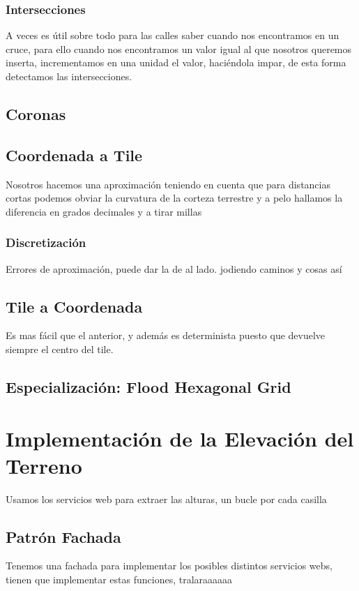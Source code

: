 \subsubsection*{Intersecciones}
A veces es útil sobre todo para las calles saber cuando nos encontramos en un
cruce, para ello cuando nos encontramos un valor igual al que nosotros queremos
inserta, incrementamos en una unidad el valor, haciéndola impar, de esta forma
detectamos las intersecciones.
\subsection*{Coronas}
\subsection*{Coordenada a Tile}
Nosotros hacemos una aproximación teniendo en cuenta que para distancias cortas
podemos obviar la curvatura de la corteza terrestre y a pelo hallamos la
diferencia en grados decimales y a tirar millas
\subsubsection*{Discretización}
Errores de aproximación, puede dar la de al lado. jodiendo caminos y cosas así
\subsection*{Tile a Coordenada}
Es mas fácil que el anterior, y además es determinista puesto que devuelve
siempre el centro del tile.
\subsection*{Especialización: Flood Hexagonal Grid}
\section*{Implementación de la Elevación del Terreno}
Usamos los servicios web para extraer las alturas, un bucle por cada casilla
\subsection*{Patrón Fachada} %
Tenemos una fachada para implementar los posibles distintos servicios webs,
tienen que implementar estas funciones, tralaraaaaaa
